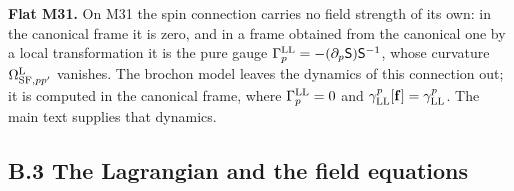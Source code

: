 \documentclass[
  10pt,
]{article}
\begin{document}
\textbf{Flat M31.} On M31 the spin connection carries no field strength
of its own: in the canonical frame it is zero, and in a frame obtained
from the canonical one by a local transformation it is the pure gauge
\(\Gamma^{\rm LL}_p=-(\partial_p\mathsf S)\mathsf S^{-1}\), whose
curvature \(\Omega^{\rm L}_{{\rm SF},pp'}\) vanishes. The brochon model
leaves the dynamics of this connection out; it is computed in the
canonical frame, where \(\Gamma^{\rm LL}_p=0\) and
\(\gamma^p_{\rm LL}[\mathbf f]=\gamma^p_{\rm LL}\). The main text
supplies that dynamics.

\hypertarget{b.3-the-lagrangian-and-the-field-equations}{%
\subsection{B.3 The Lagrangian and the field
equations}\label{b.3-the-lagrangian-and-the-field-equations}}
\end{document}
